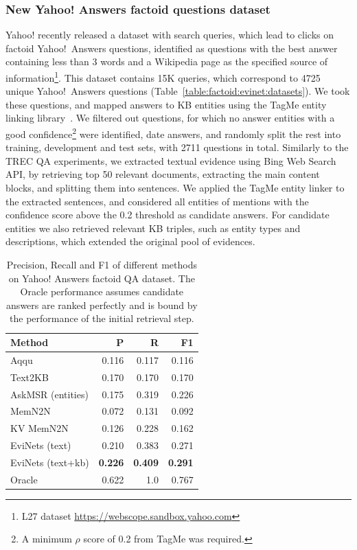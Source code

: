 \subsubsection{New Yahoo! Answers factoid questions dataset}
\label{section:factoid:evinet:eval:yahoo}

Yahoo! recently released a dataset with search queries, which lead to clicks on factoid Yahoo!~Answers questions, identified as questions with the best answer containing less than 3 words and a Wikipedia page as the specified source of information\footnote{L27 dataset \href{url}{https://webscope.sandbox.yahoo.com}}.
This dataset contains 15K queries, which correspond to 4725 unique Yahoo!~Answers questions (Table~\ref{table:factoid:evinet:datasets}).
We took these questions, and mapped answers to KB entities using the TagMe entity linking library~\cite{ferragina2010tagme}.
We filtered out questions, for which no answer entities with a good confidence\footnote{A minimum  $\rho$ score of 0.2 from TagMe was required.} were identified, \eg date answers, and randomly split the rest into training, development and test sets, with 2711 questions in total.
Similarly to the TREC QA experiments, we extracted textual evidence using Bing Web Search API, by retrieving top 50 relevant documents, extracting the main content blocks, and splitting them into sentences.
We applied the TagMe entity linker to the extracted sentences, and considered all entities of mentions with the confidence score above the 0.2 threshold as candidate answers.
For candidate entities we also retrieved relevant KB triples, such as entity types and descriptions, which extended the original pool of evidences.

\begin{table}
\centering
\begin{tabular}{p{6cm}rrr}
Method & P & R & F1 \\
\hline
Aqqu & 0.116 & 0.117 & 0.116 \\
Text2KB & 0.170 & 0.170 & 0.170 \\
AskMSR (entities) & 0.175 & 0.319 & 0.226 \\
\hline
MemN2N & 0.072	& 0.131 & 0.092 \\
KV MemN2N & 0.126 & 0.228 & 0.162 \\
\hline
EviNets (text) & 0.210 & 0.383 & 0.271 \\
EviNets (text+kb) & \textbf{0.226} & \textbf{0.409} & \textbf{0.291} \\
\hline
Oracle & 0.622 & 1.0 & 0.767 \\
\end{tabular}
\caption{Precision, Recall and F1 of different methods on Yahoo! Answers factoid QA dataset. The Oracle performance assumes candidate answers are ranked perfectly and is bound by the performance of the initial retrieval step.}
\label{table:factoid:evinet:eval:yahoo}
\end{table}

